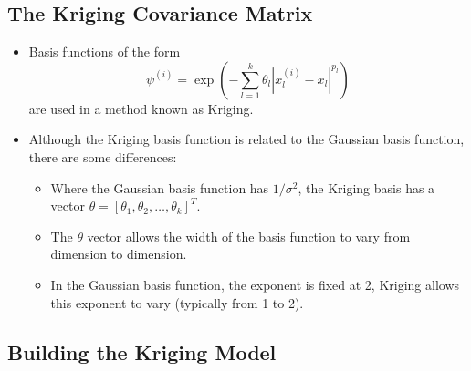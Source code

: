 \documentclass[
  letterpaper,
  DIV=11,
  numbers=noendperiod]{scrreprt}
\providecommand{\tightlist}{%
  \setlength{\itemsep}{0pt}\setlength{\parskip}{0pt}}\usepackage{longtable,booktabs,array}
\begin{document}
\hypertarget{the-kriging-covariance-matrix}{%
\subsection{The Kriging Covariance
Matrix}\label{the-kriging-covariance-matrix}}

\begin{itemize}
\tightlist
\item
  Basis functions of the form
  \begin{equation} \psi^{(i)} = \exp \left( - \sum_{l=1}^k \theta_l | x_{l}^{(i)} - x_{l} | ^{p_l} \right) \end{equation}
  are used in a method known as Kriging.
\item
  Although the Kriging basis function is related to the Gaussian basis
  function, there are some differences:

  \begin{itemize}
  \tightlist
  \item
    Where the Gaussian basis function has \(1/\sigma^2\), the Kriging
    basis has a vector
    \(\theta = [\theta_1, \theta_2, \ldots, \theta_k]^T\).
  \item
    The \(\theta\) vector allows the width of the basis function to vary
    from dimension to dimension.
  \item
    In the Gaussian basis function, the exponent is fixed at 2, Kriging
    allows this exponent to vary (typically from 1 to 2).
  \end{itemize}
\end{itemize}

\hypertarget{building-the-kriging-model}{%
\subsection{Building the Kriging
Model}\label{building-the-kriging-model}}
\end{document}
